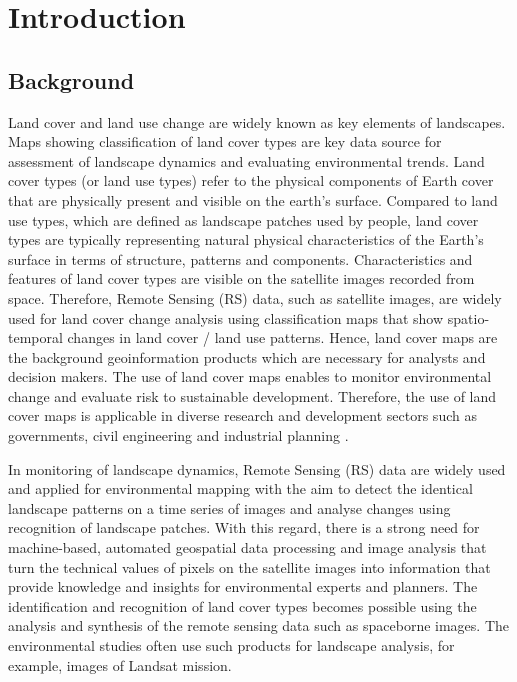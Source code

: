 \documentclass[earth,article,submit,pdftex,moreauthors]{Definitions/mdpi}
\begin{document}
\section{Introduction}


\subsection{Background}
{Land cover and land use change are widely known as key elements of landscapes. Maps {showing classification of land cover types} are key data source for assessment of landscape dynamics and evaluating environmental trends. }Land cover types (or land use types) refer to {the} physical{ }components of Earth cover { that are physically present and visible on the earth's surface}. Compared to land use types, which are defined as landscape patches{ }used by{ }people, land cover types are typically representing {natural }physical characteristics of the Earth's surface in terms of structure, patterns and components. {Characteristics and features of land cover types are visible on the satellite images recorded from space}. {Therefore, }Remote {Sensing} (RS) data, such as satellite images, are widely used for land cover change analysis {using} classification maps {that show} spatio-temporal changes in land cover / land use patterns. Hence, {land }cover maps are the background geoinformation products which are necessary for analysts and decision makers. The use of land cover maps enables to monitor environmental change and evaluate risk to sustainable development. Therefore, the use of land cover maps is applicable in diverse research and development sectors such as governments, civil engineering and industrial planning \cite{9553499}.

{In monitoring of landscape dynamics, {Remote Sensing} (RS) data are widely used and applied for environmental mapping {with the aim to detect }the identical landscape patterns on a time series of images and{ }analyse changes using recognition of landscape patches. With this regard, there is a strong need for machine-based, automated geospatial data processing and image analysis that turn the technical values of pixels on the satellite images into information that provide knowledge and insights for environmental experts and planners. The} identification{ and recognition of land cover types becomes }possible using {the }analysis and synthesis of {the }remote sensing data such as spaceborne images. {The} environmental studies often use {such} products{ for landscape analysis, for example, images }of Landsat mission. 
\end{document}
